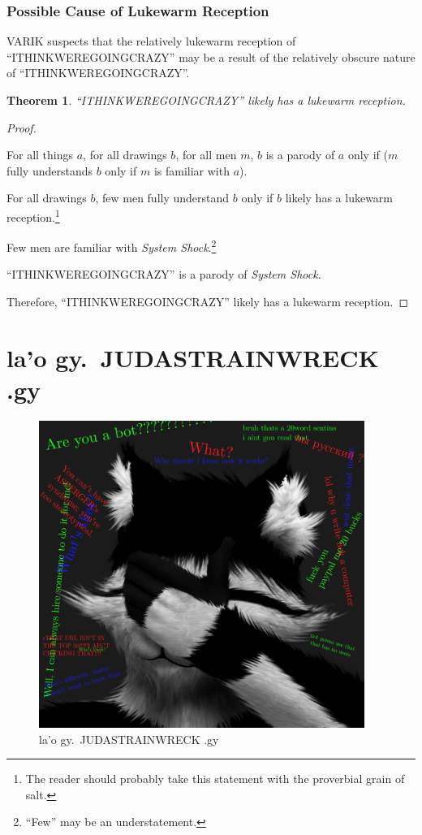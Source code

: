\documentclass{report}
\newtheorem{thm}{Theorem}
\begin{document}
\subsection{Possible Cause of Lukewarm Reception}
VARIK suspects that the relatively lukewarm reception of ``ITHINKWEREGOINGCRAZY'' may be a result of the relatively obscure nature of ``ITHINKWEREGOINGCRAZY''.
\begin{thm}
``ITHINKWEREGOINGCRAZY'' likely has a lukewarm reception.
\end{thm}
\begin{proof}
${}$

For all things $a$, for all drawings $b$, for all men $m$, $b$ is a parody of $a$ only if ($m$ fully understands $b$ only if $m$ is familiar with $a$).

For all drawings $b$, few men fully understand $b$ only if $b$ likely has a lukewarm reception.\footnote{The reader should probably take this statement with the proverbial grain of salt.}

Few men are familiar with \textit{System Shock}.\footnote{``Few'' may be an understatement.}

``ITHINKWEREGOINGCRAZY'' is a parody of \textit{System Shock}.

Therefore, ``ITHINKWEREGOINGCRAZY'' likely has a lukewarm reception.
\end{proof}
\chapter{la'o gy.\ JUDASTRAINWRECK .gy}
\begin{figure}[ht]
	\centering
	\includegraphics[height=10cm]{judastrainwreck/judastrainwreck.png}
	\caption[center]{la'o gy.\ JUDASTRAINWRECK .gy}
\end{figure}
\end{document}
